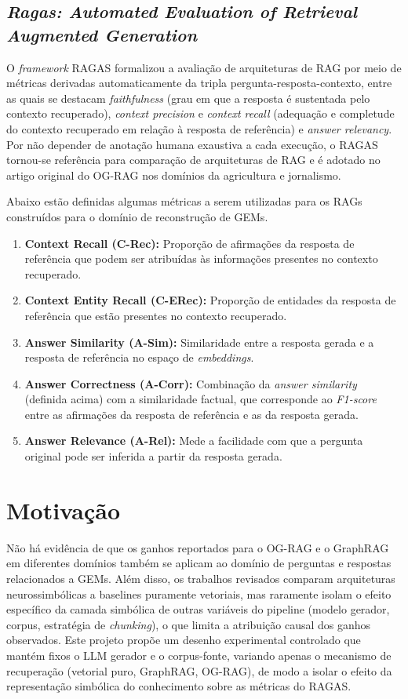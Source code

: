 \documentclass{article}
\begin{document}
\subsection{\textit{Ragas: Automated Evaluation of Retrieval Augmented Generation}}

O \textit{framework} RAGAS \cite{es-etal-2024-ragas} formalizou a avaliação de arquiteturas de RAG por meio de métricas derivadas automaticamente da tripla pergunta-resposta-contexto, entre as quais se destacam \textit{faithfulness} (grau em que a resposta é sustentada pelo contexto recuperado), \textit{context precision} e \textit{context recall} (adequação e completude do contexto recuperado em relação à resposta de referência) e \textit{answer relevancy}. Por não depender de anotação humana exaustiva a cada execução, o RAGAS tornou-se referência para comparação de arquiteturas de RAG e é adotado no artigo original do OG-RAG \cite{sharma2025ograg} nos domínios da agricultura e jornalismo.

Abaixo estão definidas algumas métricas a serem utilizadas para os RAGs construídos para o domínio de reconstrução de GEMs.

\begin{enumerate}
	\item \textbf{Context Recall (C-Rec):} Proporção de afirmações da resposta de referência que podem ser atribuídas às informações presentes no contexto recuperado.
	\item \textbf{Context Entity Recall (C-ERec):} Proporção de entidades da resposta de referência que estão presentes no contexto recuperado.
	\item \textbf{Answer Similarity (A-Sim):} Similaridade entre a resposta gerada e a resposta de referência no espaço de \textit{embeddings}.
	\item \textbf{Answer Correctness (A-Corr):} Combinação da \textit{answer similarity} (definida acima) com a similaridade factual, que corresponde ao \textit{F1-score} entre as afirmações da resposta de referência e as da resposta gerada.
	\item \textbf{Answer Relevance (A-Rel):} Mede a facilidade com que a pergunta original pode ser inferida a partir da resposta gerada.
\end{enumerate}

\section{Motivação}

Não há evidência de que os ganhos reportados para o OG-RAG e o GraphRAG em diferentes domínios também se aplicam ao domínio de perguntas e respostas relacionados a GEMs. Além disso, os trabalhos revisados comparam arquiteturas neurossimbólicas a baselines puramente vetoriais, mas raramente isolam o efeito específico da camada simbólica de outras variáveis do pipeline (modelo gerador, corpus, estratégia de \textit{chunking}), o que limita a atribuição causal dos ganhos observados. Este projeto propõe um desenho experimental controlado que mantém fixos o LLM gerador e o corpus-fonte, variando apenas o mecanismo de recuperação (vetorial puro, GraphRAG, OG-RAG), de modo a isolar o efeito da representação simbólica do conhecimento sobre as métricas do RAGAS.
\end{document}

